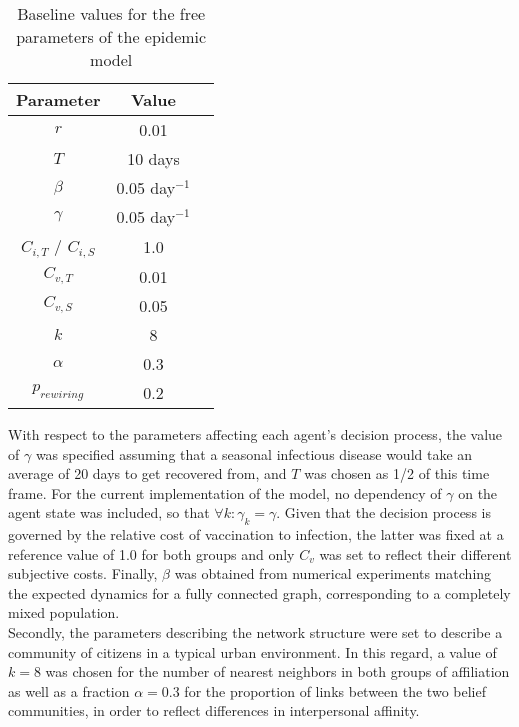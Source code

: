 \documentclass[11pt]{article}
\begin{document}
\begin{table}[htbp]
        \centering
        \begin{tabular}{|c|c|c|}
        \hline
                Parameter    &    Value       \\
         \hline
                 \(r\)       &    0.01        \\
	\hline
                 \(T\)       &    10 days        \\
        \hline
                 \(\beta\)   &    0.05 day\(^{-1}\)        \\
        \hline
                 \(\gamma\)   &    0.05  day\(^{-1}\)      \\
        \hline
                 \(C_{i,T}\) / \(C_{i,S}\) &    1.0    \\
        \hline
                 \(C_{v,T}\)  &    0.01       \\
        \hline
		 \(C_{v,S}\)  &    0.05       \\
        \hline
		 \(k\)  &    8      	      \\
        \hline
		 \(\alpha\)  &    0.3         \\
        \hline
		 \(p_{rewiring}\)  &    0.2   \\
        \hline
        \end{tabular}
        \caption{Baseline values for the free parameters of the epidemic model}
        \label{tab:Table1}
    \end{table}

With respect to the parameters affecting each agent's decision process, the value of \(\gamma\) was specified assuming that a seasonal infectious disease would take an average of 20 days to get recovered from, and \(T\) was chosen as 1/2 of this time frame. For the current implementation of the model, no dependency of \(\gamma\) on the agent state was included, so that \(\forall k : \gamma_{k} = \gamma\). Given that the decision process is governed by the relative cost of vaccination to infection, the latter was fixed at a reference value of 1.0 for both groups and only \(C_v\) was set to reflect their different subjective costs. Finally, \(\beta\) was obtained from numerical experiments matching the expected dynamics for a fully connected graph, corresponding to a completely mixed population.\\
Secondly, the parameters describing the network structure were set to describe a community of citizens in a typical urban environment. In this regard, a value of \(k = 8\) was chosen for the number of nearest neighbors in both groups of affiliation as well as a fraction \(\alpha = 0.3\) for the proportion of links between the two belief communities, in order to reflect differences in interpersonal affinity.
\end{document}
